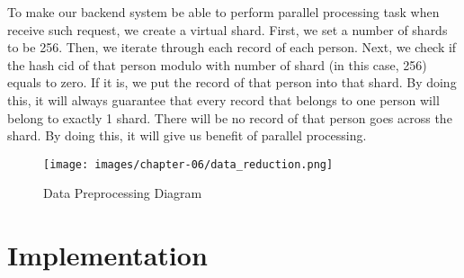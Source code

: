         To make our backend system be able to perform parallel processing task when receive such request, we create a virtual shard. First, we set a number of shards to be 256. Then, we iterate through each record of each person. Next, we check if the hash cid of that person modulo with number of shard (in this case, 256) equals to zero. If it is, we put the record of that person into that shard. By doing this, it will always guarantee that every record that belongs to one person will belong to exactly 1 shard. There will be no record of that person goes across the shard. By doing this, it will give us benefit of parallel processing.
        
        \FloatBarrier
            \begin{figure}[h!]
                \centering
                	\texttt{[image: images/chapter-06/data\_reduction.png]}
                	\caption{Data Preprocessing Diagram}
                	\label{data_preprocessing}
            \end{figure}
        \FloatBarrier
    
    \section{Implementation}
    
            
    

